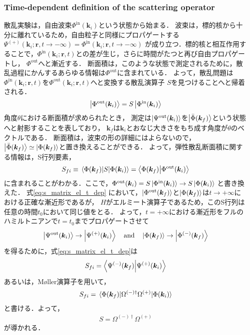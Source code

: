 \documentclass[a4paper,11pt]{ltjsarticle}
\numberwithin{equation}{section}
\begin{document}
\subsubsection{Time-dependent definition of the scattering operator}
散乱実験は，自由波束$\Phi^{\text{in}}(\bm{k}_i)$という状態から始まる．
波束は，標的核から十分に離れているため，自由粒子と同様にプロパゲートする
$\Psi^{(+)}(\bm{k}_i; \bm{r}, t\rightarrow -\infty) = \Phi^{\text{in}} (\bm{k}_i;\bm{r}, t \rightarrow -\infty)$
が成り立つ．標的核と相互作用することで，$\Phi^{\text{in}} (\bm{k}_i; \bm{r}, t)$との差が生じ，さらに時間がたつと再び自由プロパゲートし，
$\Phi^{\text{out}}$へと漸近する．
断面積は，このような状態で測定されるために，散乱過程にかんするあらゆる情報は$\Phi^{\text{out}}$に含まれている．
よって，散乱問題は$\Phi^{\text{in}}(\bm{k}_i;\bm{r},t)$を$\Phi^{\text{out}}(\bm{k}_i;\bm{r}, t)$へと変換する散乱演算子
$S$を見つけることへと帰着される．
\begin{align}
  \ket{\Phi^{\text{out}}(\bm{k}_i)} = S \ket{\Phi^{\text{in}}(\bm{k}_i)}
\end{align}
角度$\theta$における断面積が求められたとき，
測定は$\ket{\Psi^{\text{out}}(\bm{k}_i)}$を$\ket{\bar{\Phi}(\bm{k}_f)}$という状態へと射影することを表しており，
$\bm{k}_f$は$\bm{k}_i$とおなじ大きさをもち成す角度が$\theta$のベクトルである．
断面積は，波束の形の詳細にはよらないので，
$\ket{\bar{\Phi}(\bm{k}_f)} \simeq \ket{\Phi(\bm{k}_f)}$と置き換えることができる．
よって，弾性散乱断面積に関する情報は，S行列要素，
\begin{align}\label{eq:s_matrix_el_t_dep}
  S_{fi} \equiv \mel{\Phi(\bm{k}_f)}{S}{\Phi(\bm{k}_i)} = \braket{\Phi(\bm{k}_f)}{\Phi^{\text{out}}(\bm{k}_i)}  
\end{align} 
に含まれることがわかる．ここで，$\Phi^{\text{out}}(\bm{k}_i) = S \ket{\Phi^{\text{in}}(\bm{k}_i)} \rightarrow S \ket{\Phi(\bm{k}_i)}$ 
と書き換えた．
式\ref{eq:s_matrix_el_t_dep}
において，$\ket{\Phi^{\text{out}}(\bm{k}_f)}$と$\ket{\Phi(\bm{k}_f)}$は$t \rightarrow +\infty$における正確な漸近形であるが，
$H$がエルミート演算子であるため，このS行列は任意の時間$t_0$において同じ値をとる．
よって，$t = +\infty$における漸近形をフルのハミルトニアンで$t = t_0$までプロパゲートさせて
\begin{align*}
  \ket{\Psi^{\text{out}}(\bm{k}_i)} \rightarrow \ket{\Psi^{(+)}(\bm{k}_i)} \quad \mathrm{and} \quad \ket{\Phi(\bm{k}_f)} \rightarrow \ket{\Phi^{(-)}(\bm{k}_f)}
\end{align*}
を得るために，式\ref{eq:s_matrix_el_t_dep}は
\begin{align}
  S_{fi} = \braket{\Psi^{(-)}(\bm{k}_f)}{\Psi^{(+)}(\bm{k}_i)}
\end{align}
あるいは，M\o ller演算子を用いて，
\begin{align}
  S_{fi} = \mel{\Phi(\bm{k}_f)}{\Omega^{(-)\dagger}\Omega^{(+)}}{\Phi(\bm{k}_i)}
\end{align}
と書ける．よって，
\begin{align}
  S = \Omega^{(-)\dagger}\Omega^{(+)}
\end{align}
が導かれる．
\end{document}
